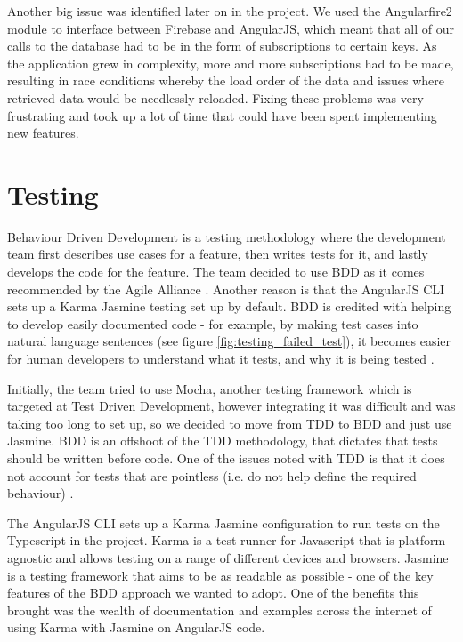 \documentclass{l3proj}
\begin{document}
Another big issue was identified later on in the project. We used the
 Angularfire2 module to interface between Firebase and AngularJS, which meant
 that all of our calls to the database had to be in the form of subscriptions
 to certain keys. As the application grew in complexity, more and more
 subscriptions had to be made, resulting in race conditions
 whereby the load order of the data and issues where retrieved data would
 be needlessly reloaded. Fixing these problems was very frustrating and took
 up a lot of time that could have been spent implementing new features.

\section{Testing} %
\label{sec:testing}

Behaviour Driven Development is a testing methodology where the development team
 first describes use cases for a feature, then writes tests for it, and lastly
 develops the code for the feature. The team decided to use BDD as it comes
 recommended by the Agile Alliance \cite{agilealliance_bdd}. Another reason
 is that the AngularJS CLI sets up a Karma Jasmine testing set up by default.
 BDD is credited with helping to develop easily documented code - for example,
 by making test cases into natural language sentences (see figure
 \ref{fig:testing_failed_test}), it becomes easier for human developers to
 understand what it tests, and why it is being tested \cite{north2006bdd}.
 
Initially, the team tried to use Mocha, another testing framework which 
 is targeted at Test Driven Development, however integrating it was 
 difficult and was taking too long to set up, so we decided to move 
 from TDD to BDD and just use Jasmine. BDD is an offshoot of the TDD
 methodology\cite{agilealliance_bdd}, that dictates that tests should be 
 written before code. One of the issues noted with TDD is that it does
 not account for tests that are pointless (i.e. do not help define the
 required behaviour) \cite{north2006bdd}.

 

The AngularJS CLI sets up a Karma Jasmine configuration to run tests on
 the Typescript in the project. Karma is a test runner for Javascript
 that is platform agnostic and allows testing on a range of different devices
 and browsers\cite{jina2013javascript}. Jasmine is a testing framework
 that aims to be as readable as possible - one of the key features of
 the BDD approach we wanted to adopt. One of the
 benefits this brought was the wealth of documentation and examples
 across the internet of using Karma with Jasmine on AngularJS code.
\end{document}
